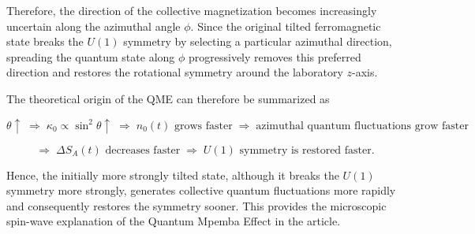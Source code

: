 \documentclass[10pt,a4paper,twocolumn]{article}
\begin{document}
		Therefore, the direction of the collective magnetization becomes increasingly uncertain along the azimuthal angle \(\phi\). Since the original tilted ferromagnetic state breaks the \(U(1)\) symmetry by selecting a particular azimuthal direction, spreading the quantum state along \(\phi\) progressively removes this preferred direction and restores the rotational symmetry around the laboratory \(z\)-axis. 
		
		The theoretical origin of the QME can therefore be summarized as
		
		$$
		\theta\uparrow
		\;\Rightarrow\;
		\kappa_0\propto\sin^2\theta\uparrow
		\;\Rightarrow\;
		n_0(t)\text{ grows faster}
		\;\Rightarrow\;
		\text{azimuthal quantum fluctuations grow faster}
		$$
		
		$$
		\Rightarrow\;
		\Delta S_A(t)\text{ decreases faster}
		\;\Rightarrow\;
		U(1)\text{ symmetry is restored faster}.
		$$
		
		Hence, the initially more strongly tilted state, although it breaks the \(U(1)\) symmetry more strongly, generates collective quantum fluctuations more rapidly and consequently restores the symmetry sooner. This provides the microscopic spin-wave explanation of the Quantum Mpemba Effect in the article.  	 
 
\end{document}
